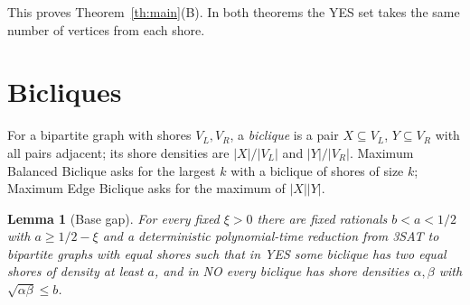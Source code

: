 \documentclass[11pt,letterpaper]{article}
\newtheorem{lemma}[theorem]{Lemma}
\theoremstyle{definition}
\theoremstyle{remark}
\begin{document}
This proves Theorem~\ref{th:main}(B). In both theorems the YES set takes
the same number of vertices from each shore.

\section{Bicliques}\label{sec:biclique}

For a bipartite graph with shores \(V_L,V_R\), a \emph{biclique} is a pair
\(X\subseteq V_L\), \(Y\subseteq V_R\) with all pairs adjacent; its shore
densities are \(|X|/|V_L|\) and \(|Y|/|V_R|\). Maximum Balanced Biclique
asks for the largest \(k\) with a biclique of shores of size \(k\); Maximum
Edge Biclique asks for the maximum of \(|X||Y|\).

\begin{lemma}[Base gap]\label{lem:basegap}
For every fixed \(\xi>0\) there are fixed rationals \(b<a<1/2\) with
\(a\ge1/2-\xi\) and a deterministic polynomial-time reduction from 3SAT to
bipartite graphs with equal shores such that in YES some biclique has two
equal shores of density at least \(a\), and in NO every biclique has shore
densities \(\alpha,\beta\) with \(\sqrt{\alpha\beta}\le b\).
\end{lemma}
\end{document}
